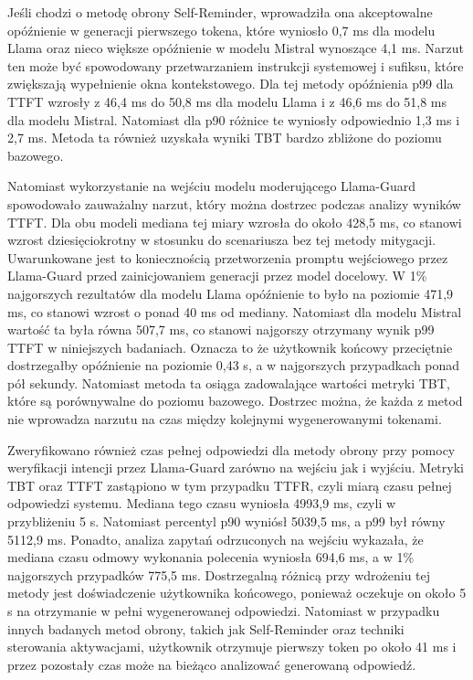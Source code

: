 Jeśli chodzi o metodę obrony Self-Reminder, wprowadziła ona akceptowalne opóźnienie w generacji pierwszego tokena, które wyniosło 0,7 ms dla modelu Llama oraz nieco większe opóźnienie w modelu Mistral wynoszące 4,1 ms. Narzut ten może być spowodowany przetwarzaniem instrukcji systemowej i sufiksu, które zwiększają wypełnienie okna kontekstowego. Dla tej metody opóźnienia p99 dla \gls{TTFT} wzrosły z 46,4 ms do 50,8 ms dla modelu Llama i z 46,6 ms do 51,8 ms dla modelu Mistral. Natomiast dla p90 różnice te wyniosły odpowiednio 1,3 ms i 2,7 ms. Metoda ta również uzyskała wyniki \gls{TBT} bardzo zbliżone do poziomu bazowego.

Natomiast wykorzystanie na wejściu modelu moderującego Llama-Guard spowodowało zauważalny narzut, który można dostrzec podczas analizy wyników \gls{TTFT}. Dla obu modeli mediana tej miary wzrosła do około 428,5 ms, co stanowi wzrost dziesięciokrotny w stosunku do scenariusza bez tej metody mitygacji. Uwarunkowane jest to koniecznością przetworzenia promptu wejściowego przez Llama-Guard przed zainicjowaniem generacji przez model docelowy. W 1\% najgorszych rezultatów dla modelu Llama opóźnienie to było na poziomie 471,9 ms, co stanowi wzrost o ponad 40 ms od mediany. Natomiast dla modelu Mistral wartość ta była równa 507,7 ms, co stanowi najgorszy otrzymany wynik p99 \gls{TTFT} w niniejszych badaniach. Oznacza to że użytkownik końcowy przeciętnie dostrzegałby opóźnienie na poziomie 0,43 s, a w najgorszych przypadkach ponad pół sekundy. Natomiast metoda ta osiąga zadowalające wartości metryki \gls{TBT}, które są porównywalne do poziomu bazowego. Dostrzec można, że każda z metod nie wprowadza narzutu na czas między kolejnymi wygenerowanymi tokenami.

Zweryfikowano również czas pełnej odpowiedzi dla metody obrony przy pomocy weryfikacji intencji przez Llama-Guard zarówno na wejściu jak i wyjściu. Metryki \gls{TBT} oraz \gls{TTFT} zastąpiono w tym przypadku \gls{TTFR}, czyli miarą czasu pełnej odpowiedzi systemu. Mediana tego czasu wyniosła 4993,9 ms, czyli w przybliżeniu 5 s. Natomiast percentyl p90 wyniósł 5039,5 ms, a p99 był równy 5112,9 ms. Ponadto, analiza zapytań odrzuconych na wejściu wykazała, że mediana czasu odmowy wykonania polecenia wyniosła 694,6 ms, a w 1\% najgorszych przypadków 775,5 ms. Dostrzegalną różnicą przy wdrożeniu tej metody jest doświadczenie użytkownika końcowego, ponieważ oczekuje on około 5 s na otrzymanie w pełni wygenerowanej odpowiedzi. Natomiast w przypadku innych badanych metod obrony, takich jak Self-Reminder oraz techniki sterowania aktywacjami, użytkownik otrzymuje pierwszy token po około 41 ms i przez pozostały czas może na bieżąco analizować generowaną odpowiedź.